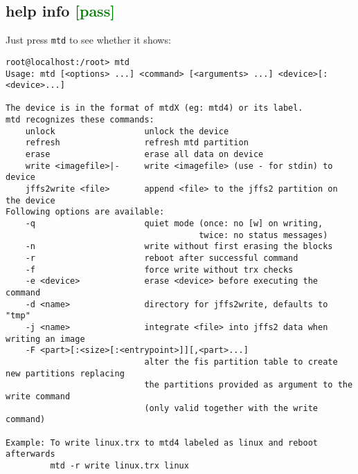 \documentclass[a4paper]{report}
\begin{document}
\subsection{help info \textcolor{green}{[pass]}}
Just press {\tt mtd} to see whether it shows:
\begin{lstlisting}
root@localhost:/root> mtd
Usage: mtd [<options> ...] <command> [<arguments> ...] <device>[:<device>...]

The device is in the format of mtdX (eg: mtd4) or its label.
mtd recognizes these commands:
    unlock                  unlock the device
    refresh                 refresh mtd partition
    erase                   erase all data on device
    write <imagefile>|-     write <imagefile> (use - for stdin) to device
    jffs2write <file>       append <file> to the jffs2 partition on the device
Following options are available:
    -q                      quiet mode (once: no [w] on writing,
                                       twice: no status messages)
    -n                      write without first erasing the blocks
    -r                      reboot after successful command
    -f                      force write without trx checks
    -e <device>             erase <device> before executing the command
    -d <name>               directory for jffs2write, defaults to "tmp"
    -j <name>               integrate <file> into jffs2 data when writing an image
    -F <part>[:<size>[:<entrypoint>]][,<part>...]
                            alter the fis partition table to create new partitions replacing
                            the partitions provided as argument to the write command
                            (only valid together with the write command)

Example: To write linux.trx to mtd4 labeled as linux and reboot afterwards
         mtd -r write linux.trx linux
\end{lstlisting}
\end{document}
